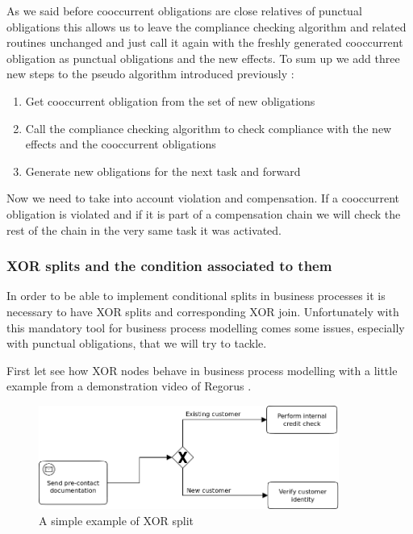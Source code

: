 \documentclass[10pt]{article}
\begin{document}
As we said before cooccurrent obligations are close relatives of punctual obligations this allows us to leave the compliance checking algorithm and related routines unchanged and just call it again with the freshly generated cooccurrent obligation as punctual obligations and the new effects. To sum up we add three new steps to the pseudo algorithm introduced previously :
\begin{enumerate}
\item Get cooccurrent obligation from the set of new obligations
\item Call the compliance checking algorithm to check compliance with the new effects and the cooccurrent obligations
\item Generate new obligations for the next task and forward
\end{enumerate}

Now we need to take into account violation and compensation. If a cooccurrent obligation is violated and if it is part of a compensation chain we will check the rest of the chain in the very same task it was activated. 

\subsubsection{XOR splits and the condition associated to them}
In order to be able to implement conditional splits in business processes it is necessary to have XOR splits and corresponding XOR join. Unfortunately with this mandatory tool for business process modelling comes some issues, especially with punctual obligations, that we will try to tackle.

First let see how XOR nodes behave in business process modelling with a little example from a demonstration video of Regorus \autocite{regorusVid}.

\begin{figure}[!h] %
\begin{center}
\includegraphics[height=3.4cm]{XOR.png} %
\caption{A simple example of XOR split} %
\end{center}
\label{image_soleil} %
\end{figure} %
\end{document}
